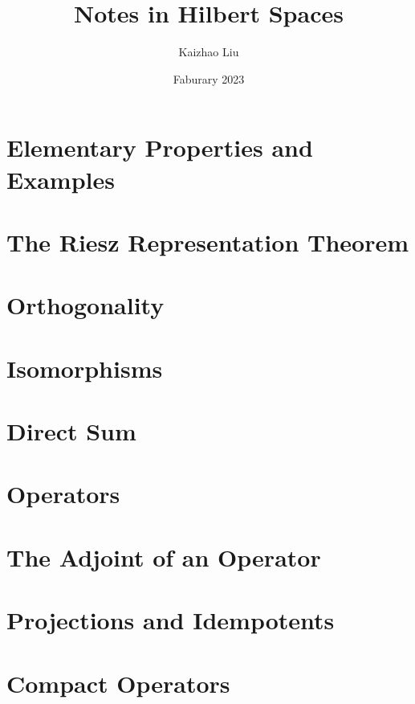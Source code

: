 \documentclass{article}
\title{Notes in Hilbert Spaces}
\author{Kaizhao Liu}
\date{Faburary 2023}
\theoremstyle{definition}
\begin{document}
\maketitle
\tableofcontents

\section{Elementary Properties and Examples}


\section{The Riesz Representation Theorem}


\section{Orthogonality}


\section{Isomorphisms}



\section{Direct Sum}



\section{Operators}


\section{The Adjoint of an Operator}


\section{Projections and Idempotents}


\section{Compact Operators}
\end{document}
